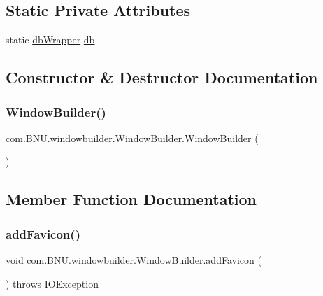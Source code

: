 \subsection*{Static Private Attributes}
\begin{DoxyCompactItemize}
\item 
static \mbox{\hyperlink{interfacecom_1_1_b_n_u_1_1database_1_1db_wrapper}{db\+Wrapper}} \mbox{\hyperlink{classcom_1_1_b_n_u_1_1windowbuilder_1_1_window_builder_abf1b12aaff327773fa36f06bcaaefc91}{db}}
\end{DoxyCompactItemize}


\subsection{Constructor \& Destructor Documentation}
\mbox{\label{classcom_1_1_b_n_u_1_1windowbuilder_1_1_window_builder_ad04792ea904860f3a355ec6db3d8e977}} 
\subsubsection{\texorpdfstring{Window\+Builder()}{WindowBuilder()}}
{\footnotesize\ttfamily com.\+B\+N\+U.\+windowbuilder.\+Window\+Builder.\+Window\+Builder (\begin{DoxyParamCaption}{ }\end{DoxyParamCaption})}



\subsection{Member Function Documentation}
\mbox{\label{classcom_1_1_b_n_u_1_1windowbuilder_1_1_window_builder_a551d16c8923a0c3769b28d6b4a3cccae}} 
\subsubsection{\texorpdfstring{add\+Favicon()}{addFavicon()}}
{\footnotesize\ttfamily void com.\+B\+N\+U.\+windowbuilder.\+Window\+Builder.\+add\+Favicon (\begin{DoxyParamCaption}{ }\end{DoxyParamCaption}) throws I\+O\+Exception\hspace{0.3cm}{\ttfamily [private]}}

